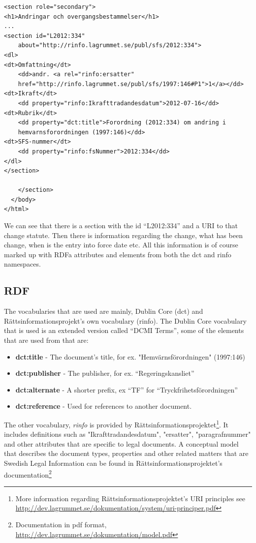 \begin{verbatim}
<section role="secondary">
<h1>Andringar och overgangsbestammelser</h1>
...
<section id="L2012:334" 
    about="http://rinfo.lagrummet.se/publ/sfs/2012:334">
<dl>
<dt>Omfattning</dt>
    <dd>andr. <a rel="rinfo:ersatter"
    href="http://rinfo.lagrummet.se/publ/sfs/1997:146#P1">1</a></dd>
<dt>Ikraft</dt>
    <dd property="rinfo:Ikrafttradandesdatum">2012-07-16</dd>
<dt>Rubrik</dt>
    <dd property="dct:title">Forordning (2012:334) om andring i 
    hemvarnsforordningen (1997:146)</dd>
<dt>SFS-nummer</dt>
    <dd property="rinfo:fsNummer">2012:334</dd>
</dl>
</section>

    </section>
  </body>
</html>
\end{verbatim}
\linebreak
\newline
We can see that there is a section with the id “L2012:334” and a URI to that change statute. Then there is information regarding the change, what has been change, when is the entry into force date etc. All this information is of course marked up with RDFa attributes and elements from both the dct and rinfo namespaces. 
 
\subsection{RDF}
The vocabularies that are used are mainly, Dublin Core (dct) and Rättsinformationsprojekt's own vocabulary (rinfo). The Dublin Core vocabulary that is used is an extended version called “DCMI Terms”, some of the elements that are used from that are:\\ 
\begin{itemize}
\item \textbf{dct:title} - The document's title, for ex. "Hemvärnsförordningen" (1997:146)
\item \textbf{dct:publisher} - The publisher, for ex. “Regeringskansliet”
\item \textbf{dct:alternate} - A shorter prefix, ex “TF” for “Tryckfrihetsförordningen”
\item \textbf{dct:reference} - Used for references to another document. 
\end{itemize}
The other vocabulary, \textit{rinfo} is provided by Rättsinformationsprojektet\footnote{More information regarding Rättsinformationsprojektet's URI principles see \url{http://dev.lagrummet.se/dokumentation/system/uri-principer.pdf}}. It includes definitions such as "Ikrafttradandesdatum", "ersatter", "paragrafnummer" and other attributes that are specific to legal documents. A conceptual model that describes the document types, properties and other related matters that are Swedish Legal Information can be found in Rättsinformationsprojektet's documentation\footnote{Documentation in pdf format, \url{http://dev.lagrummet.se/dokumentation/model.pdf}}

